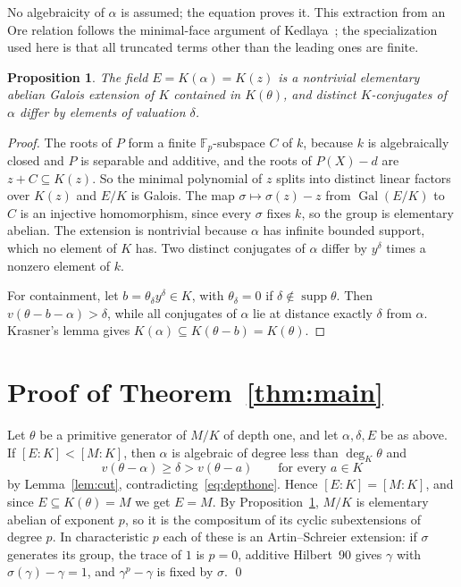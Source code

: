 \documentclass[11pt]{article}
\newtheorem{proposition}[lemma]{Proposition}
\newcommand{\F}{\mathbb F}
\newcommand{\supp}{\operatorname{supp}}
\newcommand{\Gal}{\operatorname{Gal}}
\begin{document}
No algebraicity of $\alpha$ is assumed; the equation proves it. This extraction from an Ore relation follows the minimal-face argument of Kedlaya~\cite[Lemma~9.3]{Ked}; the specialization used here is that all truncated terms other than the leading ones are finite.

\begin{proposition}\label{prop:block}
The field $E=K(\alpha)=K(z)$ is a nontrivial elementary abelian Galois extension of $K$ contained in $K(\theta)$, and distinct $K$-conjugates of $\alpha$ differ by elements of valuation $\delta$.
\end{proposition}

\begin{proof}
The roots of $P$ form a finite $\F_p$-subspace $C$ of $k$, because $k$ is algebraically closed and $P$ is separable and additive, and the roots of $P(X)-d$ are $z+C\subseteq K(z)$. So the minimal polynomial of $z$ splits into distinct linear factors over $K(z)$ and $E/K$ is Galois. The map $\sigma\mapsto\sigma(z)-z$ from $\Gal(E/K)$ to $C$ is an injective homomorphism, since every $\sigma$ fixes $k$, so the group is elementary abelian. The extension is nontrivial because $\alpha$ has infinite bounded support, which no element of $K$ has. Two distinct conjugates of $\alpha$ differ by $y^\delta$ times a nonzero element of $k$.

For containment, let $b=\theta_\delta y^\delta\in K$, with $\theta_\delta=0$ if $\delta\notin\supp\theta$. Then $v(\theta-b-\alpha)>\delta$, while all conjugates of $\alpha$ lie at distance exactly $\delta$ from $\alpha$. Krasner's lemma gives $K(\alpha)\subseteq K(\theta-b)=K(\theta)$.
\end{proof}

\section{Proof of Theorem~\ref{thm:main}}\label{sec:proof}

Let $\theta$ be a primitive generator of $M/K$ of depth one, and let $\alpha,\delta,E$ be as above. If $[E:K]<[M:K]$, then $\alpha$ is algebraic of degree less than $\deg_K\theta$ and
\[
v(\theta-\alpha)\ge\delta>v(\theta-a)\qquad\text{for every }a\in K
\]
by Lemma~\ref{lem:cut}, contradicting~\eqref{eq:depthone}. Hence $[E:K]=[M:K]$, and since $E\subseteq K(\theta)=M$ we get $E=M$. By Proposition~\ref{prop:block}, $M/K$ is elementary abelian of exponent $p$, so it is the compositum of its cyclic subextensions of degree $p$. In characteristic $p$ each of these is an Artin--Schreier extension: if $\sigma$ generates its group, the trace of $1$ is $p=0$, additive Hilbert~90 gives $\gamma$ with $\sigma(\gamma)-\gamma=1$, and $\gamma^p-\gamma$ is fixed by $\sigma$. \qed
\end{document}
